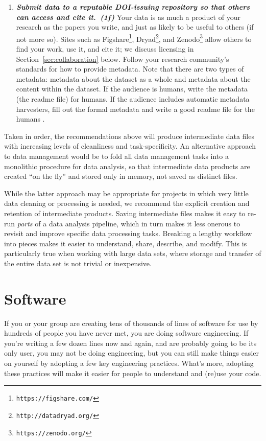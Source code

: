 \documentclass[10pt,letterpaper]{article}
\newcommand{\withurl}[2]{{#1}\footnote{{\texttt{#2}}}}
\newcommand{\practicesection}[2]{\section{#1}\label{#2}}
\newcommand{\practice}[2]{\textbf{\emph{{#2}~({#1})}}}
\begin{document}
\begin{enumerate}
\item

  \practice{1f}{Submit data to a reputable DOI-issuing repository so
  that others can access and cite it.}  Your data is as much a
  product of your research as the papers you write, and just as likely
  to be useful to others (if not more so).  Sites such as
  \withurl{Figshare}{https://figshare.com/},
  \withurl{Dryad}{http://datadryad.org/}, and
  \withurl{Zenodo}{https://zenodo.org/} allow others to find your
  work, use it, and cite it; we discuss licensing in
  Section~\ref{sec:collaboration} below. Follow your research
  community's standards for how to provide metadata. Note that there
  are two types of metadata: metadata about the dataset as a whole and
  metadata about the content within the dataset. If the audience is
  humans, write the metadata (the readme file) for humans. If the
  audience includes automatic metadata harvesters, fill out the formal
  metadata and write a good readme file for the humans
  \cite{wickes2015}.

\end{enumerate}

Taken in order, the recommendations above will produce intermediate
data files with increasing levels of cleanliness and
task-specificity. An alternative approach to data management would be
to fold all data management tasks into a monolithic procedure for data
analysis, so that intermediate data products are created ``on the
fly'' and stored only in memory, not saved as distinct files.

While the latter approach may be appropriate for projects in which
very little data cleaning or processing is needed, we recommend the
explicit creation and retention of intermediate products. Saving
intermediate files makes it easy to re-run \emph{parts} of a data
analysis pipeline, which in turn makes it less onerous to revisit and
improve specific data processing tasks. Breaking a lengthy workflow
into pieces makes it easier to understand, share, describe, and
modify. This is particularly true when working with large data sets,
where storage and transfer of the entire data set is not trivial or
inexpensive.

\practicesection{Software}{sec:software}

If you or your group are creating tens of thousands of lines of
software for use by hundreds of people you have never met, you are
doing software engineering. If you're writing a few dozen lines now
and again, and are probably going to be its only user, you may not be
doing engineering, but you can still make things easier on yourself by
adopting a few key engineering practices. What's more, adopting these
practices will make it easier for people to understand and (re)use
your code.
\end{document}
